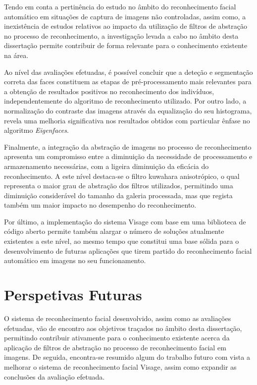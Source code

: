 Tendo em conta a pertinência do estudo no âmbito do reconhecimento facial automático em situações de captura de imagens não controladas, assim como, a inexistência de estudos relativos ao impacto da utilização de filtros de abstração no processo de reconhecimento, a investigação levada a cabo no âmbito desta dissertação permite contribuir de forma relevante para o conhecimento existente na área. 

Ao nível das avaliações efetuadas, é possível concluir que a deteção e segmentação correta das faces constituem as etapas de pré-processamento mais relevantes para a obtenção de resultados positivos no reconhecimento dos indivíduos, independentemente do algoritmo de reconhecimento utilizado. Por outro lado, a normalização do contraste das imagens através da equalização do seu histograma, revela uma melhoria significativa nos resultados obtidos com particular ênfase no algoritmo \textit{Eigenfaces}. 

Finalmente, a integração da abstração de imagens no processo de reconhecimento apresenta um compromisso entre a diminuição da necessidade de processamento e armazenamento necessárias, com a ligeira diminuição da eficácia do reconhecimento. A este nível destaca-se o filtro kuwahara anisotrópico, o qual representa o maior grau de abstração dos filtros utilizados, permitindo uma diminuição considerável do tamanho da galeria processada, mas que regista também um maior impacto no desempenho do reconhecimento.

Por último, a implementação do sistema Visage com base em uma biblioteca de código aberto permite também alargar o número de soluções atualmente existentes a este nível, ao mesmo tempo que constitui uma base sólida para o desenvolvimento de futuras aplicações que tirem partido do reconhecimento facial automático em imagens no seu funcionamento.

\section{Perspetivas Futuras}
O sistema de reconhecimento facial desenvolvido, assim como as avaliações efetuadas, vão de encontro aos objetivos traçados no âmbito desta dissertação, permitindo contribuir ativamente para o conhecimento existente acerca da aplicação de filtros de abstração no processo de reconhecimento facial em imagens. De seguida, encontra-se resumido algum do trabalho futuro com vista a melhorar o sistema de reconhecimento facial Visage, assim como expandir as conclusões da avaliação efetuada.

